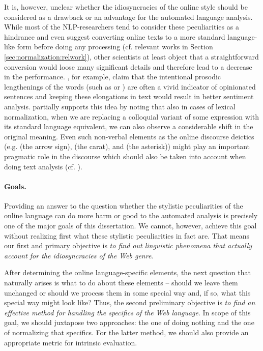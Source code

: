 It is, however, unclear whether the idiosyncracies of the online style should
be considered as a drawback or an advantage for the automated language
analysis.  While most of the NLP-researchers tend to consider these
peculiarities as a hindrance and even suggest converting online texts to a
more standard language-like form before doing any processing (cf. relevant
works in Section \ref{sec:normalization:relwork}), other scientists at least
object that a straightforward conversion would loose many significant details
and therefore lead to a decrease in the performance.
\citet{BrodyDiakopoulos:11}, for example, claim that the intentional prosodic
lengthenings of the words (such as  or
) are often a vivid indicator of opinionated sentences
and keeping these elongations in text would result in better sentiment
analysis.  \citet{Eisenstein:13} partially supports this idea by noting that
also in cases of lexical normalization, when we are replacing a colloquial
variant of some expression with its standard language equivalent, we can also
observe a considerable shift in the original meaning.  Even such non-verbal
elements as the online discourse deictics (e.g. \texample{\upshape <--} (the
arrow sign), \texample{\upshape\^{}} (the carat), and \texample{\upshape *}
(the asterisk)) might play an important pragmatic role in the discourse which
should also be taken into account when doing text analysis
(cf. \citet{Collister:11,Collister:12}).

\paragraph{Goals.}

Providing an answer to the question whether the stylistic peculiarities of the
online language can do more harm or good to the automated analysis is
precisely one of the major goals of this dissertation.  We cannot, however,
achieve this goal without realizing first what these stylistic peculiarities
in fact are.  That means our first and primary objective is \emph{to find out
  linguistic phenomena that actually account for the idiosyncracies of the Web
  genre}.

After determining the online language-specific elements, the next question
that naturally arises is what to do about these elements -- should we leave
them unchanged or should we process them in some special way and, if so, what
this special way might look like?  Thus, the second preliminary objective is
\emph{to find an effective method for handling the specifics of the Web
  language}.  In scope of this goal, we should juxtapose two approaches: the
one of doing nothing and the one of normalizing that specifics.  For the
latter method, we should also provide an appropriate metric for intrinsic
evaluation.

